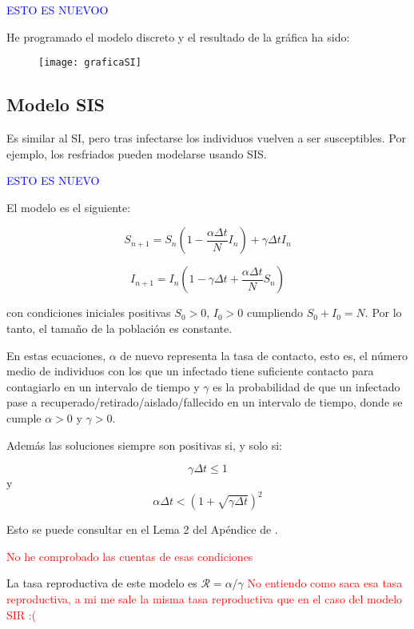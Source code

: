 \textcolor{blue}{ESTO ES NUEVOO}

He programado el modelo discreto y el resultado de la gráfica ha sido:

\begin{figure}[H]
\begin{center}
\texttt{[image: graficaSI]}
\end{center}
\end{figure}


\subsection{Modelo SIS}
Es similar al SI, pero tras infectarse los individuos vuelven a ser susceptibles.
Por ejemplo, los resfriados pueden modelarse usando SIS.

\textcolor{blue}{ESTO ES NUEVO}

El modelo es el siguiente:

\begin{equation}
\label{eqn: modelo_SIS_S}
S_{n+1} = S_n \left(1-\frac{\alpha\Delta t}{N} I_n \right) + \gamma \Delta t I_n
\end{equation}

\begin{equation}
\label{eqn: modelo_SIS_I}
I_{n+1} = I_n \left( 1-\gamma \Delta t + \frac{\alpha\Delta t}{N} S_n \right)
\end{equation}

con condiciones iniciales positivas $S_0>0$, $I_0>0$ cumpliendo $S_0+I_0=N$. Por lo tanto, el tamaño de la población es constante.

En estas ecuaciones, $\alpha$ de nuevo representa la tasa de contacto, esto es, el número medio de individuos con los que un infectado tiene suficiente contacto para contagiarlo en un intervalo de tiempo y $\gamma$ es la probabilidad de que un infectado pase a recuperado/retirado/aislado/fallecido en un intervalo de tiempo, donde se cumple $\alpha >0$ y $\gamma >0$.

Además las soluciones siempre son positivas si, y solo si:

$$\gamma \Delta t \leq 1 $$ y $$\alpha\Delta t< \left( 1+\sqrt{\gamma \Delta t} \right)^2$$

Esto se puede consultar en el Lema 2 del Apéndice de \cite{allenDiscretetimeSISIR1994}.

\textcolor{red}{No he comprobado las cuentas de esas condiciones}

La tasa reproductiva de este modelo es $\mathcal{R}=\alpha /\gamma$ \textcolor{red}{No entiendo como saca esa tasa reproductiva, a mi me sale la misma tasa reproductiva que en el caso del modelo SIR :(}

